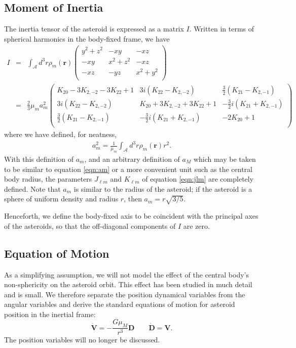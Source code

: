 \documentclass{aastex631}
\newcommand{\parens}[1]{\left( #1 \right)}
\begin{document}
\subsection{Moment of Inertia}
The inertia tensor of the asteroid is expressed as a matrix $I$. Written in terms of spherical harmonics in the body-fixed frame, we have
\begin{eqnarray}
I & = &\int_\mathcal{A} d^3 r\rho_m(\bm r) \parens{\begin{array}{ccc}
y^2 + z^2 & -xy & -xz \\
-xy & x^2 + z^2 & -xz \\
-xz & -yz & x^2 + y^2 \\
\end{array}}\\
& = &\frac{2}{3}\mu_m a_m^2\parens{\begin{array}{ccc}
K_{20}-3K_{2,-2}-3K_{22}+1 & 3i \parens{K_{22}-K_{2,-2}} & \frac{3}{2}\parens{K_{21}-K_{2,-1}}\\
3i \parens{K_{22}-K_{2,-2}} & K_{20}+3K_{2,-2}+3K_{22}+1 & -\frac{3}{2}i\parens{K_{21}+K_{2,-1}}\\
\frac{3}{2}\parens{K_{21}-K_{2,-1}} & -\frac{3}{2}i\parens{K_{21}+K_{2,-1}} & -2K_{20}+1\\
\end{array}}
\label{eqn:moi}
\end{eqnarray}
where we have defined, for neatness,
\begin{eqnarray}
a_m^2=\frac{1}{\mu_m}\int_\mathcal{A} d^3 r \rho_m(\bm r) r^2.
\label{eqn:am}
\end{eqnarray}
With this definition of $a_m$, and an arbitrary definition of $a_M$ which may be taken to be similar to equation \ref{eqn:am} or a more convenient unit such as the central body radius, the parameters $J_{\ell m}$ and $K_{\ell m}$ of equation \ref{eqn:jlm} are completely defined. Note that $a_m$ is similar to the radius of the asteroid; if the asteroid is a sphere of uniform density and radius $r$, then $a_m = r\sqrt{3/5}$.

Henceforth, we define the body-fixed axis to be coincident with the principal axes of the asteroids, so that the off-diagonal components of $I$ are zero.

\subsection{Equation of Motion}
As a simplifying assumption, we will not model the effect of the central body's non-sphericity on the asteroid orbit. This effect has been studied in much detail and is small. We therefore separate the position dynamical variables from the angular variables and derive the standard equations of motion for asteroid position in the inertial frame:
\begin{equation}
\dot{\bm{V}} = -\frac{G\mu_M}{r^3}\bm{D}\qquad \dot{\bm{D}} = \bm{V}.
\label{eqn:translaton-eom}
\end{equation}
The position variables will no longer be discussed.
\end{document}
